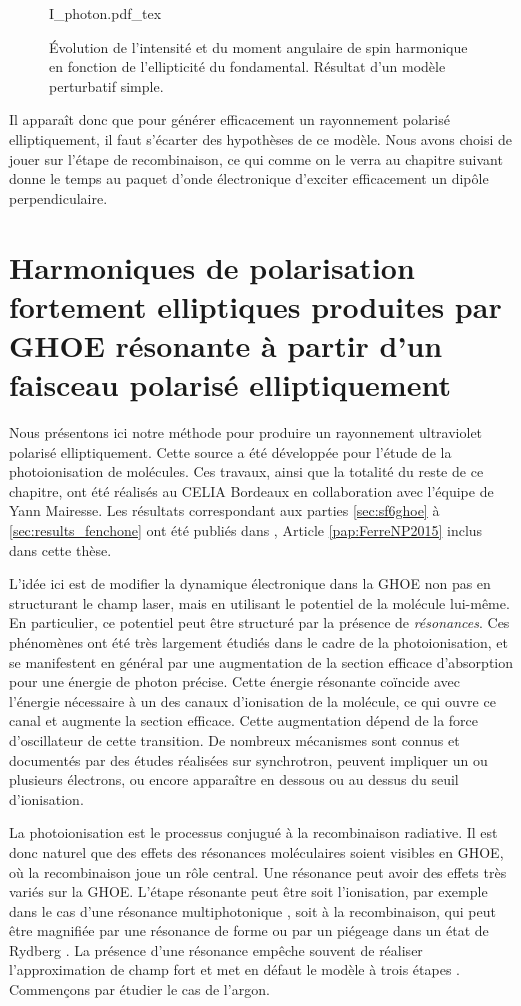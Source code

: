 \begin{figure}[!ht]
\centering
\def\svgwidth{1\columnwidth}
{I_photon.pdf_tex}
\caption{\'Evolution de l'intensité et du moment angulaire de spin harmonique en fonction de l'ellipticité du fondamental. Résultat d'un modèle perturbatif simple.}
\label{fig:mas_photon}
\end{figure}

Il apparaît donc que pour générer efficacement un rayonnement polarisé elliptiquement, il faut s'écarter des hypothèses de ce modèle. Nous avons choisi de jouer sur l'étape de recombinaison, ce qui comme on le verra au chapitre suivant donne le temps au paquet d'onde électronique d'exciter efficacement un dipôle perpendiculaire. 

\chapter{Harmoniques de polarisation fortement elliptiques produites par GHOE résonante à partir d'un faisceau polarisé elliptiquement}
Nous présentons ici notre méthode pour produire un rayonnement ultraviolet polarisé elliptiquement. Cette source a été développée pour l'étude de la photoionisation de molécules. Ces travaux, ainsi que la totalité du reste de ce chapitre, ont été réalisés au CELIA Bordeaux en collaboration avec l'équipe de Yann Mairesse. Les résultats correspondant aux parties \ref{sec:sf6ghoe} à \ref{sec:results_fenchone} ont été publiés dans , Article \ref{pap:FerreNP2015} inclus dans cette thèse.

L'idée ici est de modifier la dynamique électronique dans la GHOE non pas en structurant le champ laser, mais en utilisant le potentiel de la molécule lui-même. En particulier, ce potentiel peut être structuré par la présence de \textit{résonances}. Ces phénomènes ont été très largement étudiés dans le cadre de la photoionisation, et se manifestent en général par une augmentation de la section efficace d'absorption pour une énergie de photon précise. Cette énergie résonante coïncide avec l'énergie nécessaire à un des canaux d'ionisation de la molécule, ce qui ouvre ce canal et augmente la section efficace. Cette augmentation dépend de la force d'oscillateur de cette transition. De nombreux mécanismes sont connus et documentés par des études réalisées sur synchrotron, peuvent impliquer un ou plusieurs électrons, ou encore apparaître en dessous ou au dessus du seuil d'ionisation.

La photoionisation est le processus conjugué à la recombinaison radiative. Il est donc naturel que des effets des résonances moléculaires soient visibles en GHOE, où la recombinaison joue un rôle central. Une résonance peut avoir des effets très variés sur la GHOE. L'étape résonante peut être soit l'ionisation, par exemple dans le cas d'une résonance multiphotonique , soit à la recombinaison, qui peut être magnifiée par une résonance de forme ou par un piégeage dans un état de Rydberg . La présence d'une résonance empêche souvent de réaliser l'approximation de champ fort et met en défaut le modèle à trois étapes . Commençons par étudier le cas de l'argon.


